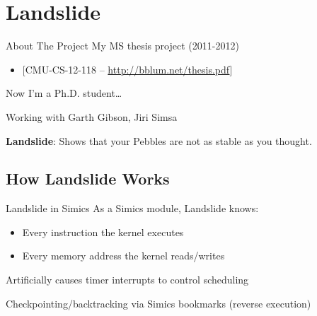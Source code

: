 \documentclass[xcolor=dvipsnames]{beamer}
\begin{document}

\section{Landslide}


\begin{frame}{About The Project}
	My MS thesis project (2011-2012)
	\begin{itemize}
		\item {}[CMU-CS-12-118 -- \url{http://bblum.net/thesis.pdf}]
	\end{itemize}

	\linegap
	Now I'm a Ph.D. student\dots

	\linegap
	Working with Garth Gibson, Jiri Simsa

	\linegap
	{\bf Landslide}: Shows that your Pebbles are not as stable as you thought.
\end{frame}


\subsection{How Landslide Works}

\begin{frame}{Landslide in Simics}
	As a Simics module, Landslide knows:
	\begin{itemize}
		\item Every instruction the kernel executes
		\item Every memory address the kernel reads/writes
	\end{itemize}
	\linegap
	Artificially causes timer interrupts to control scheduling

	\linegap
	Checkpointing/backtracking via Simics bookmarks (reverse execution)
\end{frame}
\end{document}
